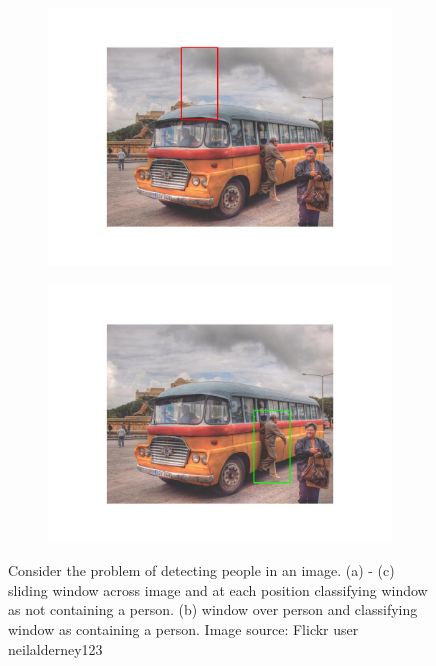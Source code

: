 \documentclass{article}
\begin{document}
\begin{figure}[H]
\begin{subfigure}{0.48\textwidth}
    \includegraphics[width=\linewidth]{sliding_window_c.jpg}
    \caption{}
  \end{subfigure}
  \hspace*{\fill} %
  \begin{subfigure}{0.48\textwidth}
    \includegraphics[width=\linewidth]{sliding_window_d.jpg}
    \caption{}
  \end{subfigure}
  \caption{Consider the problem of detecting people in an image. (a) - (c) sliding window across image and at each position classifying window as not containing a person. (b) window over person and classifying window as containing a person. Image source: Flickr user neilalderney123}
  \label{fig:sliding_window}
\end{figure}
\end{document}
